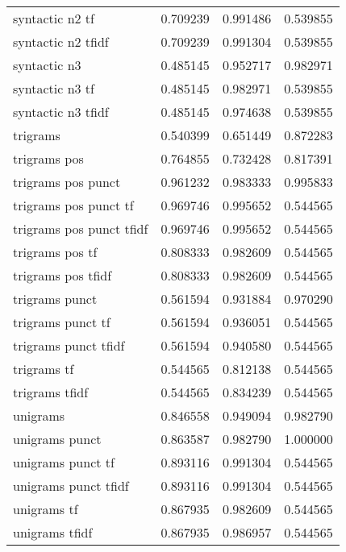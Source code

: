 \documentclass{article}
\begin{document}
\begin{table}
\begin{tabular}{lrrr}
syntactic n2 tf            &  0.709239 &       0.991486 &             0.539855 \\
syntactic n2 tfidf         &  0.709239 &       0.991304 &             0.539855 \\
syntactic n3               &  0.485145 &       0.952717 &             0.982971 \\
syntactic n3 tf            &  0.485145 &       0.982971 &             0.539855 \\
syntactic n3 tfidf         &  0.485145 &       0.974638 &             0.539855 \\
trigrams                   &  0.540399 &       0.651449 &             0.872283 \\
trigrams pos               &  0.764855 &       0.732428 &             0.817391 \\
trigrams pos punct         &  0.961232 &       0.983333 &             0.995833 \\
trigrams pos punct tf      &  0.969746 &       0.995652 &             0.544565 \\
trigrams pos punct tfidf   &  0.969746 &       0.995652 &             0.544565 \\
trigrams pos tf            &  0.808333 &       0.982609 &             0.544565 \\
trigrams pos tfidf         &  0.808333 &       0.982609 &             0.544565 \\
trigrams punct             &  0.561594 &       0.931884 &             0.970290 \\
trigrams punct tf          &  0.561594 &       0.936051 &             0.544565 \\
trigrams punct tfidf       &  0.561594 &       0.940580 &             0.544565 \\
trigrams tf                &  0.544565 &       0.812138 &             0.544565 \\
trigrams tfidf             &  0.544565 &       0.834239 &             0.544565 \\
unigrams                   &  0.846558 &       0.949094 &             0.982790 \\
unigrams punct             &  0.863587 &       0.982790 &             1.000000 \\
unigrams punct tf          &  0.893116 &       0.991304 &             0.544565 \\
unigrams punct tfidf       &  0.893116 &       0.991304 &             0.544565 \\
unigrams tf                &  0.867935 &       0.982609 &             0.544565 \\
unigrams tfidf             &  0.867935 &       0.986957 &             0.544565 \\
\bottomrule
\end{tabular}
\end{table}
\end{document}

